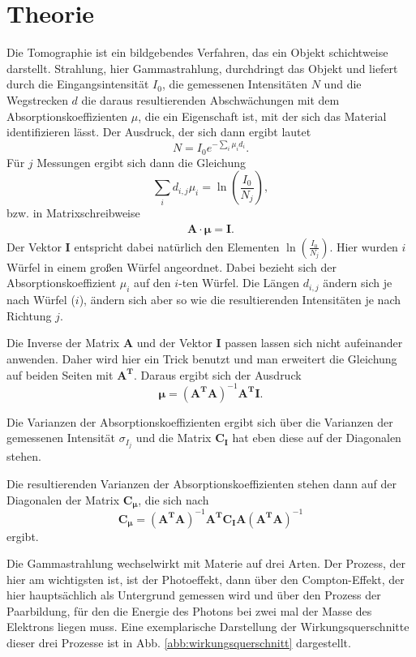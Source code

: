 \section{Theorie}

Die Tomographie ist ein bildgebendes Verfahren, das ein Objekt schichtweise darstellt. Strahlung, hier Gammastrahlung, durchdringt das Objekt und liefert durch die Eingangsintensität $I_0$, die gemessenen Intensitäten $N$ und die Wegstrecken $d$ die daraus resultierenden Abschwächungen mit dem Absorptionskoeffizienten $\mu$, die ein Eigenschaft ist, mit der sich das Material identifizieren lässt. 
Der Ausdruck, der sich dann ergibt lautet
\begin{equation*}
    N = I_0 e^{- \sum_i \mu_i d_i}.
\end{equation*}
Für $j$ Messungen ergibt sich dann die Gleichung 
\begin{equation*}
    \sum_i d_{i,j} \mu_i = \ln \left( \frac{I_0}{N_j} \right),
\end{equation*}
bzw. in Matrixschreibweise 
\begin{align*}
\mathbf{A} \cdot \mathbf{\mu} = \mathbf{I}.
\end{align*}
Der Vektor $\mathbf{I}$ entspricht dabei natürlich den Elementen $\ln \left( \frac{I_0}{N_j} \right)$.
Hier wurden $i$ Würfel in einem großen Würfel angeordnet. Dabei bezieht sich der Absorptionskoeffizient $\mu_i$ auf den $i$-ten Würfel. Die Längen $d_{i,j}$ ändern sich je nach Würfel ($i$), ändern sich aber so wie die resultierenden Intensitäten je nach Richtung $j$.

Die Inverse der Matrix $\mathbf{A}$ und der Vektor $\mathbf{I}$ passen lassen sich nicht aufeinander anwenden. Daher wird hier ein Trick benutzt und man erweitert die Gleichung auf beiden Seiten mit $\mathbf{A^T}$. Daraus ergibt sich der Ausdruck 
\begin{equation*}
    \mathbf{\mu} = \left( \mathbf{A^T} \mathbf{A} \right)^{-1} \mathbf{A^T} \mathbf{I}.
\end{equation*}

Die Varianzen der Absorptionskoeffizienten ergibt sich über die Varianzen der gemessenen Intensität $\sigma_{I_j}$ und die Matrix $\mathbf{C_{I}}$ hat eben diese auf der Diagonalen stehen.

Die resultierenden Varianzen der Absorptionskoeffizienten stehen dann auf der Diagonalen der Matrix $\mathbf{C_{\mu}}$, die sich nach 
\begin{equation*}
    \mathbf{C_{\mu}} = \left( \mathbf{A^T} \mathbf{A} \right)^{-1} \mathbf{A^T} \mathbf{C_{I}} \mathbf{A} \left( \mathbf{A^T} \mathbf{A} \right)^{-1}
\end{equation*}
ergibt.

Die Gammastrahlung wechselwirkt mit Materie auf drei Arten. Der Prozess, der hier am wichtigsten ist, ist der Photoeffekt, dann über den Compton-Effekt, der hier hauptsächlich als Untergrund gemessen wird und über den Prozess der Paarbildung, für den die Energie des Photons bei zwei mal der Masse des Elektrons liegen muss.  
Eine exemplarische Darstellung der Wirkungsquerschnitte dieser drei Prozesse ist in Abb. \ref{abb:wirkungsquerschnitt} dargestellt. 